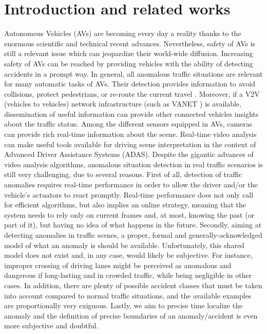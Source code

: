 \section{Introduction and related works}

Autonomous Vehicles (AVs) are becoming every day a reality thanks to the enormous scientific and technical recent advances.
Nevertheless, safety of AVs is still a relevant issue which can jeopardize their world-wide diffusion.
Increasing safety of AVs can be reached by providing vehicles with the ability of detecting accidents in a prompt way.
In general, all anomalous traffic situations are relevant for many automatic tasks of AVs.
Their detection provides information to avoid collisions, protect pedestrians, or re-route the current travel \cite{4298901}.
Moreover, if a V2V (vehicles to vehicles) network infrastructure (such as VANET \cite{fatemidokht2021efficient}) is available, dissemination of useful information can provide other connected vehicles insights about the traffic status.
Among the different sensors equipped in AVs, cameras can provide rich real-time information about the scene.
Real-time video analysis can make useful tools available for driving scene interpretation in the context of Advanced Driver Assistance Systems (ADAS).
Despite the gigantic advances of video analysis algorithms, anomalous situation detection in real traffic scenarios is still very challenging, due to several reasons.
First of all, detection of traffic anomalies requires real-time performance in order to allow the driver and/or the vehicle's actuators to react promptly.
Real-time performance does not only call for efficient algorithms, but also implies an online strategy, meaning that the system needs to rely only on current frames and, at most, knowing the past (or part of it), but having no idea of what happens in the future.
Secondly, aiming at detecting anomalies in traffic scenes, a proper, formal and generally-acknowledged model of what an anomaly is should be available.
Unfortunately, this shared model does not exist and, in any case, would likely be subjective.
For instance, improper crossing of driving lanes might be perceived as anomalous and dangerous if long-lasting and in crowded traffic, while being negligible in other cases.
In addition, there are plenty of possible accident classes that must be taken into account compared to normal traffic situations, and the available examples are proportionally very exiguous.
Lastly, we aim to precise time localize the anomaly and the definition of precise boundaries of an anomaly/accident is even more subjective and doubtful.
